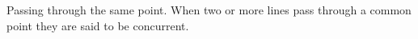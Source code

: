 Passing through the same point.
When two or more lines pass through a common point they are said to be concurrent.